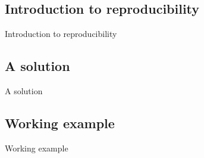 \documentclass{beamer}
\begin{document}
\frame{\titlepage}

\subsection[IntroRepro]{Introduction to reproducibility}
\begin{frame}
\huge{Introduction to reproducibility}
\end{frame}


\subsection[Solution]{A solution}
\begin{frame}
\huge{A solution}
\end{frame}


\subsection[Example]{Working example}
\begin{frame}
\huge{Working example}
\end{frame}


%

\end{document}
